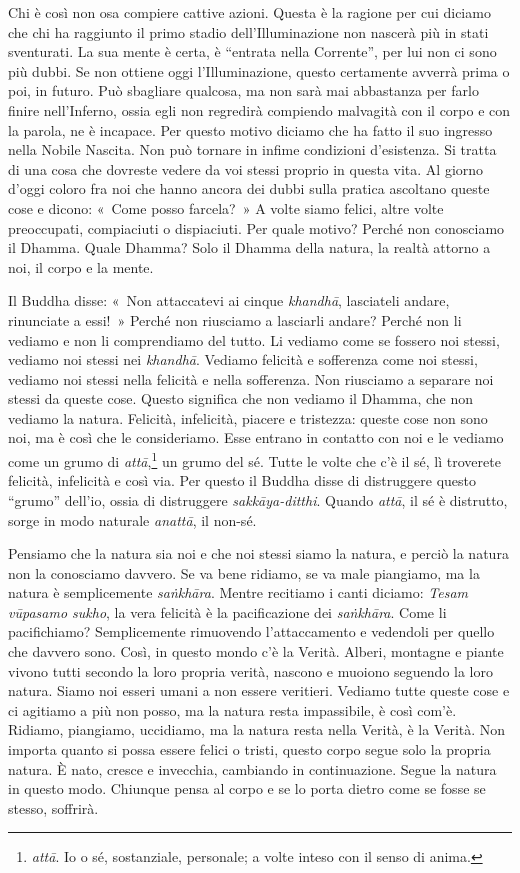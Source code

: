 Chi è così non osa compiere cattive azioni. Questa è la ragione per cui
diciamo che chi ha raggiunto il primo stadio dell'Illuminazione non
nascerà più in stati sventurati. La sua mente è certa, è ``entrata nella
Corrente'', per lui non ci sono più dubbi. Se non ottiene oggi
l'Illuminazione, questo certamente avverrà prima o poi, in futuro. Può
sbagliare qualcosa, ma non sarà mai abbastanza per farlo finire
nell'Inferno, ossia egli non regredirà compiendo malvagità con il corpo
e con la parola, ne è incapace. Per questo motivo diciamo che ha fatto
il suo ingresso nella Nobile Nascita. Non può tornare in infime
condizioni d'esistenza. Si tratta di una cosa che dovreste vedere da voi
stessi proprio in questa vita. Al giorno d'oggi coloro fra noi che hanno
ancora dei dubbi sulla pratica ascoltano queste cose e dicono: «~Come
posso farcela?~» A volte siamo felici, altre volte preoccupati,
compiaciuti o dispiaciuti. Per quale motivo? Perché non conosciamo il
Dhamma. Quale Dhamma? Solo il Dhamma della natura, la realtà attorno a
noi, il corpo e la mente.

Il Buddha disse: «~Non attaccatevi ai cinque \emph{khandhā}, lasciateli
andare, rinunciate a essi!~» Perché non riusciamo a lasciarli andare?
Perché non li vediamo e non li comprendiamo del tutto. Li vediamo come
se fossero noi stessi, vediamo noi stessi nei \emph{khandhā}. Vediamo
felicità e sofferenza come noi stessi, vediamo noi stessi nella felicità
e nella sofferenza. Non riusciamo a separare noi stessi da queste cose.
Questo significa che non vediamo il Dhamma, che non vediamo la natura.
Felicità, infelicità, piacere e tristezza: queste cose non sono noi, ma
è così che le consideriamo. Esse entrano in contatto con noi e le
vediamo come un grumo di \emph{attā},\footnote{\emph{attā}. Io o sé,
  sostanziale, personale; a volte inteso con il senso di anima.} un
grumo del sé. Tutte le volte che c'è il sé, lì troverete felicità,
infelicità e così via. Per questo il Buddha disse di distruggere questo
``grumo'' dell'io, ossia di distruggere \emph{sakkāya-ditthi}. Quando
\emph{attā}, il sé è distrutto, sorge in modo naturale \emph{anattā}, il
non-sé.

Pensiamo che la natura sia noi e che noi stessi siamo la natura, e
perciò la natura non la conosciamo davvero. Se va bene ridiamo, se va
male piangiamo, ma la natura è semplicemente \emph{saṅkhāra}. Mentre
recitiamo i canti diciamo: \emph{Tesam vūpasamo sukho}, la vera felicità
è la pacificazione dei \emph{saṅkhāra}. Come li pacifichiamo?
Semplicemente rimuovendo l'attaccamento e vedendoli per quello che
davvero sono. Così, in questo mondo c'è la Verità. Alberi, montagne e
piante vivono tutti secondo la loro propria verità, nascono e muoiono
seguendo la loro natura. Siamo noi esseri umani a non essere veritieri.
Vediamo tutte queste cose e ci agitiamo a più non posso, ma la natura
resta impassibile, è così com'è. Ridiamo, piangiamo, uccidiamo, ma la
natura resta nella Verità, è la Verità. Non importa quanto si possa
essere felici o tristi, questo corpo segue solo la propria natura. È
nato, cresce e invecchia, cambiando in continuazione. Segue la natura in
questo modo. Chiunque pensa al corpo e se lo porta dietro come se fosse
se stesso, soffrirà.

